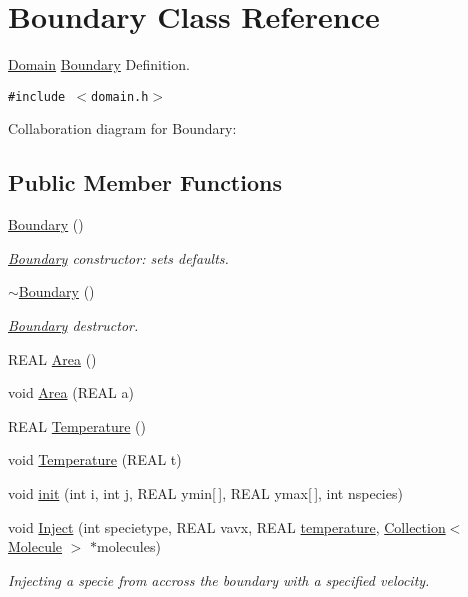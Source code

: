 \hypertarget{structBoundary}{
\section{Boundary Class Reference}
\label{structBoundary}
}
\hyperlink{classDomain}{Domain} \hyperlink{structBoundary}{Boundary} Definition.  


{\tt \#include $<$domain.h$>$}

Collaboration diagram for Boundary:\subsection*{Public Member Functions}
\begin{CompactItemize}
\item 
\hyperlink{structBoundary_7c4c8db45b13dab630e4c6ed7a958e71}{Boundary} ()
\begin{CompactList}\small\item\em \hyperlink{structBoundary}{Boundary} constructor: sets defaults. \item\end{CompactList}\item 
\hyperlink{structBoundary_86eab4f2362618c5b1e3d0df3a5f7f42}{$\sim$Boundary} ()
\begin{CompactList}\small\item\em \hyperlink{structBoundary}{Boundary} destructor. \item\end{CompactList}\item 
REAL \hyperlink{structBoundary_1e938bb18aab00e839c0c6758229a1c3}{Area} ()
\item 
void \hyperlink{structBoundary_36aefb40ee2ca353bc730efd0bdf9c63}{Area} (REAL a)
\item 
REAL \hyperlink{structBoundary_7b08a692b28e1f4ddb6d503008c92da9}{Temperature} ()
\item 
void \hyperlink{structBoundary_127d3c02420e5d8ec675e91b4fad9030}{Temperature} (REAL t)
\item 
void \hyperlink{structBoundary_67865aec3cbeb86d72d70c6ddfefe51d}{init} (int i, int j, REAL ymin\mbox{[}$\,$\mbox{]}, REAL ymax\mbox{[}$\,$\mbox{]}, int nspecies)
\item 
void \hyperlink{structBoundary_226f02b6130f1f539702f6c599c0eb15}{Inject} (int specietype, REAL vavx, REAL \hyperlink{structBoundary_74b059e4119e1739800fa93615f74ac2}{temperature}, \hyperlink{classCollection}{Collection}$<$ \hyperlink{classMolecule}{Molecule} $>$ $\ast$molecules)
\begin{CompactList}\small\item\em Injecting a specie from accross the boundary with a specified velocity. \item\end{CompactList}\end{CompactItemize}
